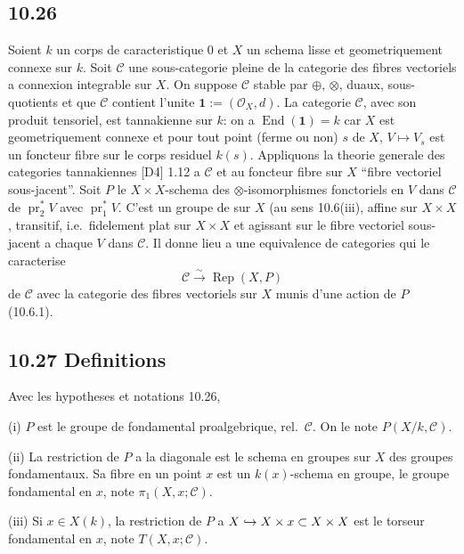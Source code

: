 \documentclass[12pt,a4paper]{article}
\theoremstyle{plain}
\theoremstyle{definition}
\theoremstyle{remark}
\DeclareMathOperator{\End}{End}
\DeclareMathOperator{\pr}{pr}
\DeclareMathOperator{\Rep}{Rep}
\begin{document}
\subsection*{10.26}

Soient $k$ un corps de caracteristique 0 et $X$ un schema lisse et geometriquement connexe sur $k$. Soit $\mathcal{C}$ une sous-categorie pleine de la categorie des fibres vectoriels a connexion integrable sur $X$. On suppose $\mathcal{C}$ stable par $\oplus$, $\otimes$, duaux, sous-quotients et que $\mathcal{C}$ contient l'unite $\mathbf{1} := (\mathcal{O}_X, d)$. La categorie $\mathcal{C}$, avec son produit tensoriel, est tannakienne sur $k$: on a $\End(\mathbf{1}) = k$ car $X$ est geometriquement connexe et pour tout point (ferme ou non) $s$ de $X$, $V \mapsto V_s$ est un foncteur fibre sur le corps residuel $k(s)$. Appliquons la theorie generale des categories tannakiennes [D4] 1.12 a $\mathcal{C}$ et au foncteur fibre sur $X$ ``fibre vectoriel sous-jacent''. Soit $P$ le $X \times X$-schema des $\otimes$-isomorphismes fonctoriels en $V$ dans $\mathcal{C}$ de $\pr_2^* V$ avec $\pr_1^* V$. C'est un groupe de sur $X$ (au sens 10.6(iii), affine sur $X \times X$, transitif, i.e.~fidelement plat sur $X \times X$ et agissant sur le fibre vectoriel sous-jacent a chaque $V$ dans $\mathcal{C}$. Il donne lieu a une equivalence de categories qui le caracterise
\begin{equation}\label{10.26.1}
\mathcal{C} \xrightarrow{\sim} \Rep(X, P) \tag{10.26.1}
\end{equation}
de $\mathcal{C}$ avec la categorie des fibres vectoriels sur $X$ munis d'une action de $P$ (10.6.1).

\subsection*{10.27 Definitions}

Avec les hypotheses et notations 10.26,

(i) $P$ est le groupe de fondamental proalgebrique, rel.~$\mathcal{C}$. On le note $P(X/k, \mathcal{C})$.

(ii) La restriction de $P$ a la diagonale est le schema en groupes sur $X$ des groupes fondamentaux. Sa fibre en un point $x$ est un $k(x)$-schema en groupe, le groupe fondamental en $x$, note $\pi_1(X, x; \mathcal{C})$.

(iii) Si $x \in X(k)$, la restriction de $P$ a $X \hookrightarrow X \times \\{x\\} \subset X \times X$ est le torseur fondamental en $x$, note $T(X, x; \mathcal{C})$.
\end{document}
